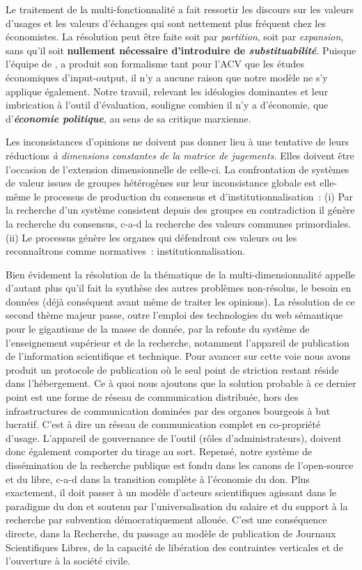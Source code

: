 Le traitement de la multi-fonctionnalité a fait ressortir les discours sur les valeurs d'usages et les valeurs d'échanges qui sont nettement plus fréquent chez les économistes.
La résolution peut être faite soit par \emph{partition}, soit par \emph{expansion}, sans qu'il soit \textbf{nullement nécessaire d'introduire de \emph{substituabilité}}.
Puisque l'équipe de \citeauthor{majeau-bettez_unified_2014}, a produit son formalisme tant pour l'ACV que les études économiques d'input-output, il n'y a aucune raison que notre modèle ne s'y applique également.
Notre travail, relevant les idéologies dominantes et leur imbrication à l'outil d'évaluation, souligne combien il n'y a d'économie, que d'\emph{\textbf{économie politique}}, au sens de sa critique marxienne.

Les inconsistances d'opinions ne doivent pas donner lieu à une tentative de leurs réductions \emph{à dimensions constantes de la matrice de jugements.}
Elles doivent être l'occasion de l'extension dimensionnelle de celle-ci.
La confrontation de systèmes de valeur issues de groupes hétérogènes sur leur inconsistance globale est elle-même le processus de production du consensus et d'institutionnalisation~:
(i) Par la recherche d'un système consistent depuis des groupes en contradiction il génère la recherche du consensus, c-a-d la recherche des valeurs communes primordiales.
(ii) Le processus génère les organes qui défendront ces valeurs ou les reconnaîtrons comme normatives~: institutionnalisation.

Bien évidement la résolution de la thématique de la multi-dimensionnalité appelle d'autant plus qu'il fait la synthèse des autres problèmes non-résolus, le besoin en données (déjà conséquent avant même de traiter les opinions).
La résolution de ce second thème majeur passe, outre l'emploi des technologies du web sémantique pour le gigantisme de la masse de donnée, par la refonte du système de l'enseignement supérieur et de la recherche, notamment l'appareil de publication de l'information scientifique et technique.
Pour avancer sur cette voie nous avons produit un protocole de publication où le seul point de striction restant réside dans l'hébergement.
Ce à quoi nous ajoutons que la solution probable à ce dernier point est une forme de réseau de communication distribuée, hors des infrastructures de communication dominées par des organes bourgeois à but lucratif.
C'est à dire un réseau de communication complet en co-propriété d'usage.
L'appareil de gouvernance de l'outil (rôles d'administrateurs), doivent donc également comporter du tirage au sort.
Repensé, notre système de dissémination de la recherche publique est fondu dans les canons de l'open-source et du libre, c-a-d dans la transition complète à l'économie du don.
Plus exactement, il doit passer à un modèle d'acteurs scientifiques agissant dans le paradigme du don et soutenu par l'universalisation du salaire et du support à la recherche par subvention démocratiquement allouée.
C'est une conséquence directe, dans la Recherche, du passage au modèle de publication de Journaux Scientifiques Libres, de la capacité de libération des contraintes verticales et de l'ouverture à la société civile.

